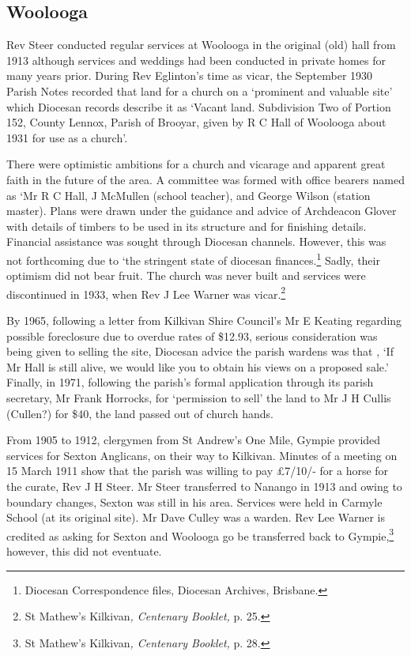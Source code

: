 \subsection{Woolooga}

Rev Steer conducted regular services at Woolooga in the original (old)
hall from 1913 although services and weddings had been conducted in
private homes for many years prior. During Rev Eglinton's time as vicar,
the September 1930 Parish Notes recorded that land for a church on a
`prominent and valuable site' which Diocesan records describe it as
`Vacant land. Subdivision Two of Portion 152, County Lennox, Parish of
Brooyar, given by R C Hall of Woolooga about 1931 for use as a church'.

There were optimistic ambitions for a church and vicarage and apparent
great faith in the future of the area. A committee was formed with
office bearers named as `Mr R C Hall, J McMullen (school teacher), and
George Wilson (station master). Plans were drawn under the guidance and
advice of Archdeacon Glover with details of timbers to be used in its
structure and for finishing details. Financial assistance was sought
through Diocesan channels. However, this was not forthcoming due to `the
stringent state of diocesan finances.\footnote{Diocesan Correspondence
  files, Diocesan Archives, Brisbane.} Sadly, their optimism did not
bear fruit. The church was never built and services were discontinued in
1933, when Rev J Lee Warner was vicar.\footnote{St Mathew's
  Kilkivan\emph{, Centenary Booklet,} p. 25.}

By 1965, following a letter from Kilkivan Shire Council's Mr E Keating
regarding possible foreclosure due to overdue rates of \$12.93, serious
consideration was being given to selling the site, Diocesan advice the
parish wardens was that , `If Mr Hall is still alive, we would like you
to obtain his views on a proposed sale.' Finally, in 1971, following the
parish's formal application through its parish secretary, Mr Frank
Horrocks, for `permission to sell' the land to Mr J H Cullis (Cullen?)
for \$40, the land passed out of church hands.

From 1905 to 1912, clergymen from St Andrew's One Mile, Gympie provided
services for Sexton Anglicans, on their way to Kilkivan. Minutes of a
meeting on 15 March 1911 show that the parish was willing to pay \pounds7/10/-
for a horse for the curate, Rev J H Steer. Mr Steer transferred to
Nanango in 1913 and owing to boundary changes, Sexton was still in his
area. Services were held in Carmyle School (at its original site). Mr
Dave Culley was a warden. Rev Lee Warner is credited as asking for
Sexton and Woolooga go be transferred back to Gympie,\footnote{St
  Mathew's Kilkivan\emph{, Centenary Booklet,} p. 28.} however, this did
not eventuate.

